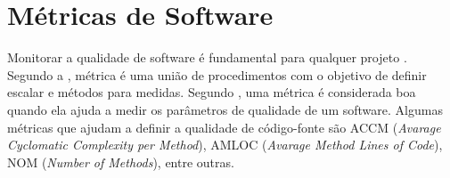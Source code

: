 \section{Métricas de Software}

Monitorar a qualidade de software é fundamental para qualquer projeto \cite{prmm}. Segundo a , métrica é uma união de procedimentos com o objetivo de definir escalar e métodos para medidas. Segundo , uma métrica é considerada boa quando ela ajuda a medir os parâmetros de qualidade de um software. Algumas métricas que ajudam a definir a qualidade de código-fonte são ACCM (\textit{Avarage Cyclomatic Complexity per Method}), AMLOC (\textit{Avarage Method Lines of Code}), NOM (\textit{Number of Methods}), entre outras.
